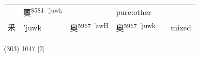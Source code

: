\documentclass[14pt,a4paper]{scrartcl}
\begin{document}
\begin{longtable}[c]{@{}llllll@{}}
\begin{minipage}[t]{0.14\columnwidth}\raggedright\strut
\strut\end{minipage} &
\begin{minipage}[t]{0.14\columnwidth}\raggedright\strut
薁\textsuperscript{8581~'juwk}
\strut\end{minipage} &
\begin{minipage}[t]{0.14\columnwidth}\raggedright\strut
\strut\end{minipage} &
\begin{minipage}[t]{0.14\columnwidth}\raggedright\strut
pure:other
\strut\end{minipage}\tabularnewline
\begin{minipage}[t]{0.14\columnwidth}\raggedright\strut
釆
\strut\end{minipage} &
\begin{minipage}[t]{0.14\columnwidth}\raggedright\strut
'juwk
\strut\end{minipage} &
\begin{minipage}[t]{0.14\columnwidth}\raggedright\strut
奧\textsuperscript{5967~'awH}
\strut\end{minipage} &
\begin{minipage}[t]{0.14\columnwidth}\raggedright\strut
奧\textsuperscript{5967~'juwk}
\strut\end{minipage} &
\begin{minipage}[t]{0.14\columnwidth}\raggedright\strut
\strut\end{minipage} &
\begin{minipage}[t]{0.14\columnwidth}\raggedright\strut
mixed
\strut\end{minipage}\tabularnewline
\bottomrule
\end{longtable}

(303) 1047 {[}2{]}
\end{document}
